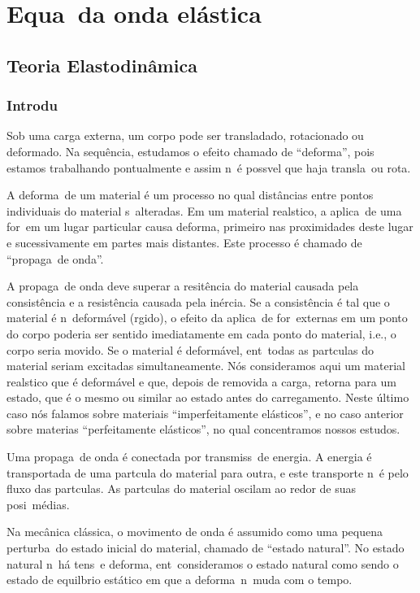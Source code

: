 \chapter{Equa\cao\ da onda el\'astica}

\section{Teoria Elastodin\^amica}

\subsection{Introdu\cao}

Sob uma carga externa, um corpo pode ser transladado,
rotacionado ou deformado. Na sequ\^encia, estudamos
o efeito chamado de ``deforma\cao'', pois estamos
trabalhando pontualmente e assim n\ao\ \'e poss\ih vel
que haja transla\cao\ ou rota\cao.

A deforma\cao\ de um material \'e um processo no qual
dist\^ancias entre pontos individuais do material s\ao\
alteradas. Em um material real\ih stico, a aplica\cao\
de uma for\ca\ em um lugar particular causa deforma\coes,
primeiro nas proximidades deste lugar e sucessivamente em
partes mais distantes. Este processo \'e chamado de
``propaga\cao\ de onda''.

A propaga\cao\ de onda deve superar a resit\^encia do
material causada pela consist\^encia e a resist\^encia
causada pela in\'ercia. Se a consist\^encia \'e tal que o
material \'e n\ao\ deform\'avel (r\ih gido), o efeito da
aplica\cao\ de for\cas\ externas em um ponto do corpo
poderia ser sentido imediatamente em cada ponto do
material, i.e., o corpo seria movido. Se o material \'e
deform\'avel, ent\ao\ todas as part\ih culas do material
seriam excitadas simultaneamente. N\'os consideramos aqui
um material real\ih stico que \'e deform\'avel e que,
depois de removida a carga, retorna para um estado, que
\'e o mesmo ou similar ao estado antes do carregamento.
Neste \'ultimo caso n\'os falamos sobre materiais
``imperfeitamente el\'asticos'', e no caso anterior sobre
materias ``perfeitamente el\'asticos'', no qual
concentramos nossos estudos.

Uma propaga\cao\ de onda \'e conectada por transmiss\ao\
de energia. A energia \'e transportada de uma part\ih cula
do material para outra, e este transporte n\ao\ \'e pelo
fluxo das part\ih culas. As part\ih culas do material
oscilam ao redor de suas posi\coes\ m\'edias.

Na mec\^anica cl\'assica, o movimento de onda \'e assumido
como uma pequena perturba\cao\ do estado inicial do material,
chamado de ``estado natural''. No estado natural n\ao\ h\'a
tens\oes\ e deforma\coes, ent\ao\ consideramos o estado
natural como sendo o estado de equil\ih brio est\'atico em que a
deforma\cao\ n\ao\ muda com o tempo.

